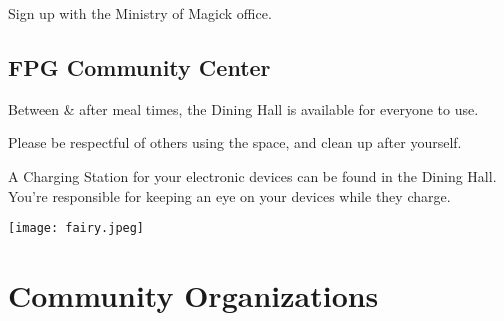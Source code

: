\documentclass[9pt,twoside,openright,final,article,letterpaper]{memoir}
\renewcommand{\pfbreakdisplay}{%
  \needspace{24pt}%
  \vspace{8pt}\\\ding{76}\quad\ding{77}\quad\ding{78}\\%
  \vspace{11pt}}
\let\oldsection=\section
\renewcommand{\section}[1]{%
  \nopagebreak
  \vspace{6pt} %
  \needspace{1.5in}
  \oldsection{#1}
  \nopagebreak}
\let\oldsubsection=\subsection
\renewcommand{\subsection}[1]{%
  \vspace{6pt}
  \needspace{1.25in}
  \oldsubsection{#1}
  \nopagebreak}
\let\oldsubsubsection=\subsubsection
\renewcommand{\subsubsection}[1]{%
  \needspace{.75in}
  \oldsubsubsection{#1}
  \nopagebreak}
\begin{document}
\begin{multicols}{2}
  Sign up with the Ministry of Magick office.


  \subsection{FPG Community Center}

  Between \& after meal times, the Dining Hall is available for
  everyone to use.

  Please be respectful of others using the space, and clean up
  after yourself.

  A Charging Station for your electronic devices can be found in the
  Dining Hall. {\small You're responsible for keeping an eye on your
    devices while they charge.}



  \vfill
  \centering  \texttt{[image: fairy.jpeg]}

\end{multicols}

\section{Community Organizations}
\end{document}
